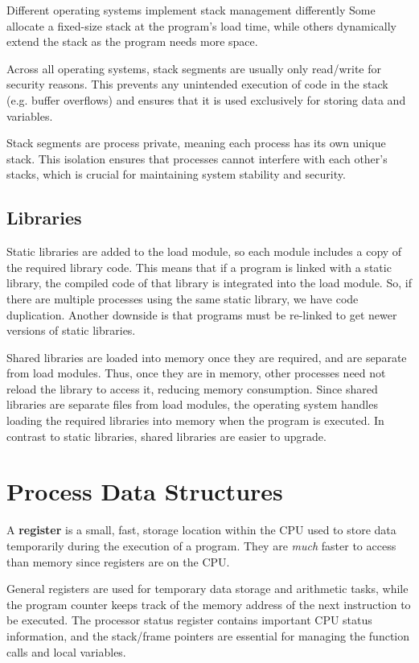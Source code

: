\documentclass{report}
\newcommand{\definitionBegin}[1]{\begin{tcolorbox}[title={Definition: #1}]}
\newcommand{\definitionEnd}{\end{tcolorbox}}
\begin{document}
Different operating systems implement stack management differently Some allocate a fixed-size stack
at the program's load time, while others dynamically extend the stack as the program needs more
space.

Across all operating systems, stack segments are usually only read/write for security reasons. This
prevents any unintended execution of code in the stack (e.g. buffer overflows) and ensures that it
is used exclusively for storing data and variables.

Stack segments are process private, meaning each process has its own unique stack. This isolation
ensures that processes cannot interfere with each other's stacks, which is crucial for maintaining
system stability and security.


\subsection{Libraries}
Static libraries are added to the load module, so each module includes a copy of the required
library code. This means that if a program is linked with a static library, the compiled code of
that library is integrated into the load module. So, if there are multiple processes using the same
static library, we have code duplication. Another downside is that programs must be re-linked to get
newer versions of static libraries.

Shared libraries are loaded into memory once they are required, and are separate from load
modules. Thus, once they are in memory, other processes need not reload the library to access
it, reducing memory consumption. Since shared libraries are separate files from load modules, the
operating system handles loading the required libraries into memory when the program is
executed. In contrast to static libraries, shared libraries are easier to upgrade.


\section{Process Data Structures}
\definitionBegin{Register}
A \textbf{register} is a small, fast, storage location within the CPU used to store data temporarily
during the execution of a program. They are \textit{much} faster to access than memory since
registers are on the CPU.
\definitionEnd

General registers are used for temporary data storage and arithmetic tasks, while the program
counter keeps track of the memory address of the next instruction to be executed. The processor
status register contains important CPU status information, and the stack/frame pointers are
essential for managing the function calls and local variables.
\end{document}

